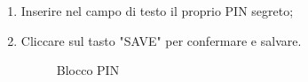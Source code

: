 \begin{enumerate}
	\item Inserire nel campo di testo il proprio PIN segreto;
	\item Cliccare sul tasto "SAVE" per confermare e salvare.

	\begin{figure}[!ht]
		\centering
		\caption{Blocco PIN}
	\end{figure}
\end{enumerate}
\newpage
